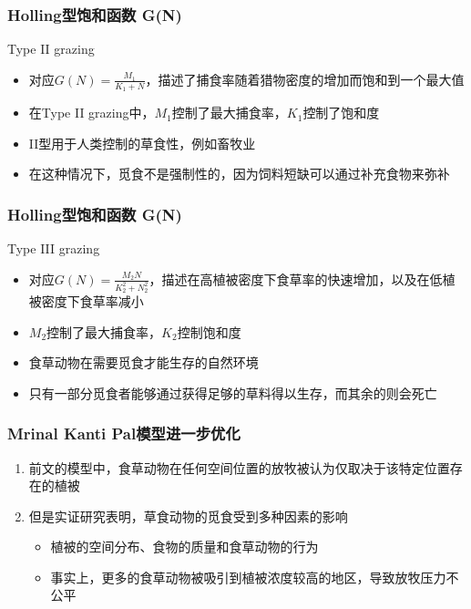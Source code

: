 \documentclass[aspectratio=169, 12pt, utf8, mathserif]{ctexbeamer} %
\begin{document}
\begin{frame}
	\frametitle{Holling型饱和函数 G(N)}
		\begin{exampleblock}{Type II grazing}
		\begin{itemize}
			\item 对应\(G(N)=\frac{M_1}{K_1+N}\)，描述了捕食率随着猎物密度的增加而饱和到一个最大值
			\item 在Type II grazing中，\(M_{1}\)控制了最大捕食率，\(K_{1}\)控制了饱和度
			\item II型用于人类控制的草食性，例如畜牧业
			\item 在这种情况下，觅食不是强制性的，因为饲料短缺可以通过补充食物来弥补
		\end{itemize}
	\end{exampleblock}
\end{frame}


\begin{frame}
		\frametitle{Holling型饱和函数 G(N)}
		\begin{exampleblock}{Type III grazing}
	\begin{itemize}
		\item 对应\({G(N)=\frac{M_2N}{K_2^2+N_2^2}}\)，描述在高植被密度下食草率的快速增加，以及在低植被密度下食草率减小
		\item \(M_{2}\)控制了最大捕食率，\(K_{2}\)控制饱和度
		\item 食草动物在需要觅食才能生存的自然环境
		\item 只有一部分觅食者能够通过获得足够的草料得以生存，而其余的则会死亡
	\end{itemize}
\end{exampleblock}
\end{frame}


\begin{frame}
	\frametitle{Mrinal Kanti Pal模型进一步优化}
		\begin{enumerate}
		\item 前文的模型中，食草动物在任何空间位置的放牧被认为仅取决于该特定位置存在的植被
		\item 但是实证研究表明，草食动物的觅食受到多种因素的影响
		\begin{itemize}
			\item 植被的空间分布、食物的质量和食草动物的行为\cite{[5]}
			\item 事实上，更多的食草动物被吸引到植被浓度较高的地区，导致放牧压力不公平
		\end{itemize}
	\end{enumerate}
\end{frame}
\end{document}
